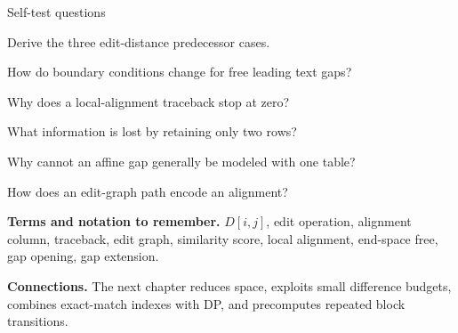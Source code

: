\documentclass[11pt,letterpaper]{article}
\begin{document}
\begin{CornellExamBox}{Self-test questions}
\begin{CornellRecallList}
  \item Derive the three edit-distance predecessor cases.
  \item How do boundary conditions change for free leading text gaps?
  \item Why does a local-alignment traceback stop at zero?
  \item What information is lost by retaining only two rows?
  \item Why cannot an affine gap generally be modeled with one table?
  \item How does an edit-graph path encode an alignment?
\end{CornellRecallList}
\end{CornellExamBox}

{\footnotesize
\textbf{Terms and notation to remember.} $D[i,j]$, edit operation, alignment column, traceback, edit graph, similarity score, local alignment, end-space free, gap opening, gap extension.

\textbf{Connections.} The next chapter reduces space, exploits small difference budgets, combines exact-match indexes with DP, and precomputes repeated block transitions.
}
\end{document}
